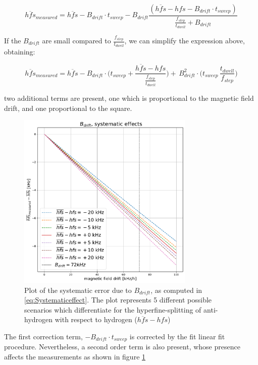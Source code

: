 \documentclass[11pt,a4paper,oneside]{article}
\begin{document}
\begin{equation} \label{eq:Systematiceffect}
\overline{hfs}_{measured} = \overline{hfs} - B_{drift} \cdot t_{sweep} - B_{drift}  \dfrac{(\overline{hfs} - hfs - B_{drift} \cdot t_{sweep})}{ \frac{f_{step}}{t_{dwell}} + B_{drift}}
\end{equation}

If the $B_{drift}$ are small compared to $\frac{f_{step}}{t_{dwell}}$, we can simplify the expression above, obtaining:

\begin{equation}
\overline{hfs}_{measured} = \overline{hfs} - B_{drift} \cdot \biggl(t_{sweep} + \frac{ \overline{hfs} - hfs}{\frac{f_{step}}{t_{dwell}}} \biggl) + \, B_{drift}^{2} \cdot \biggl( t_{sweep} \, \frac{t_{dwell}}{f_{step}} \biggl)
\end{equation}

two additional terms are present, one which is proportional to the magnetic field drift, and one proportional to the square.

\begin{figure}[!hbtp]
\centering
\includegraphics[width = 0.75\textwidth]{driftFirstOrder.pdf}
\caption{Plot of the systematic error due to $B_{drift}$, as computed in \ref{eq:Systematiceffect}. The plot represents 5 different possible scenarios which differentiate for the hyperfine-splitting of anti-hydrogen with respect to hydrogen ($\overline{hfs} - hfs$) }
\label{fig:SystematicB}
\end{figure}

\newpage
The first correction term, $- B_{drift} \cdot t_{sweep}$ is corrected by the fit linear fit procedure. Nevertheless, a second order term is also present, whose presence affects the measurements as shown in figure \ref{fig:SystematicB}
\end{document}
